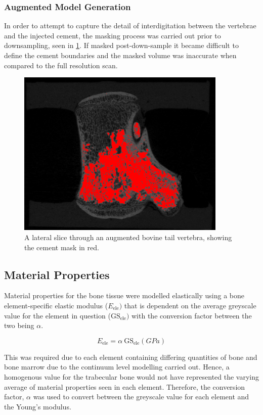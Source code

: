 \subsubsection{Augmented Model Generation}

In order to attempt to capture the detail of interdigitation between the
vertebrae and the injected cement, the masking process was carried out prior to downsampling, seen in \cref{fig:fullressVPseg}. If masked post-down-sample it became difficult to define the cement boundaries and the masked volume was inaccurate when compared to the full resolution scan.


\begin{figure}[hbt]
\centering

  \includegraphics[width=10cm]{images/fullres_VP_segment.png}
  \caption{A lateral slice through an augmented bovine tail vertebra, showing
the cement mask in red.}
\label{fig:fullressVPseg}
\end{figure}


\subsection{Material Properties}\label{material-properties-bov}

Material properties for the bone tissue were modelled elastically using a
bone element-specific elastic modulus (\(E_{\text{ele}})\) that is
dependent on the average greyscale value for the element in question
(\(\text{GS}_{\text{ele}})\) with the conversion factor between the two being $\alpha$.

\[E_{\text{ele}} = \alpha\ \text{GS}_{\text{ele}} (GPa)\]

This was required due to each element containing differing quantities of bone and bone marrow due to the continuum level modelling carried out. Hence, a homogenous value for the trabecular bone would not have represented the varying average of material properties seen in each element. Therefore, the conversion factor, $\alpha$ was used to convert between the greyscale value for each element and the Young's modulus.

